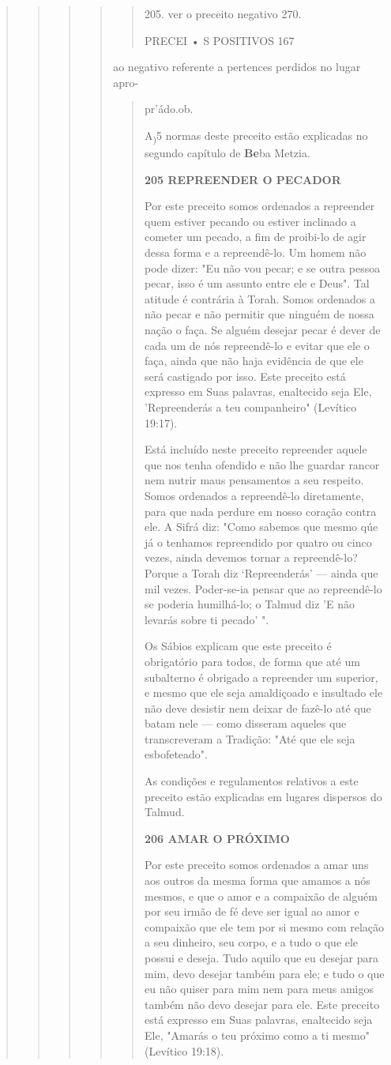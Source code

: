 \begin{quote}
\begin{quote}
\begin{quote}
\begin{quote}
\begin{quote}
205. ver o preceito negativo 270.

PRECEI • S POSITIVOS 167
\end{quote}

ao negativo referente a pertences perdidos no lugar apro-

\begin{quote}
pr'ádo.ob.

A\textsubscript{)}5 normas deste preceito estão explicadas no segundo
capítulo de \textbf{Be}ba Metzia.

\textbf{205 REPREENDER O PECADOR}

Por este preceito somos ordenados a repreender quem estiver pe­cando ou
estiver inclinado a cometer um pecado, a fim de proibi-lo de agir des­sa
forma e a repreendê-lo. Um homem não pode dizer: "Eu não vou pecar; e se
outra pessoa pecar, isso é um assunto entre ele e Deus". Tal atitude é
contrá­ria à Torah. Somos ordenados a não pecar e não permitir que
ninguém de nos­sa nação o faça. Se alguém desejar pecar é dever de cada
um de nós repreendê-lo e evitar que ele o faça, ainda que não haja
evidência de que ele será castigado por isso. Este preceito está
expresso em Suas palavras, enaltecido seja Ele, 'Re­preenderás a teu
companheiro" (Levítico 19:17).

Está incluído neste preceito repreender aquele que nos tenha ofen­dido e
não lhe guardar rancor nem nutrir maus pensamentos a seu respeito. Somos
ordenados a repreendê-lo diretamente, para que nada perdure em nos­so
coração contra ele. A Sifrá diz: "Como sabemos que mesmo qúe já o
tenha­mos repreendido por quatro ou cinco vezes, ainda devemos tornar a
repreendê-lo? Porque a Torah diz `Repreenderás' --- ainda que mil vezes.
Poder-se-ia pen­sar que ao repreendê-lo se poderia humilhá-lo; o Talmud
diz 'E não levarás so­bre ti pecado' ".

Os Sábios explicam que este preceito é obrigatório para todos, de forma
que até um subalterno é obrigado a repreender um superior, e mesmo que
ele seja amaldiçoado e insultado ele não deve desistir nem deixar de
fazê-lo até que batam nele --- como disseram aqueles que transcreveram a
Tradição: "Até que ele seja esbofeteado".

As condições e regulamentos relativos a este preceito estão explica­das
em lugares dispersos do Talmud.

\textbf{206 AMAR O PRÓXIMO}

Por este preceito somos ordenados a amar uns aos outros da mesma forma
que amamos a nós mesmos, e que o amor e a compaixão de alguém por seu
irmão de fé deve ser igual ao amor e compaixão que ele tem por si mesmo
com relação a seu dinheiro, seu corpo, e a tudo o que ele possui e
deseja. Tudo aquilo que eu desejar para mim, devo desejar também para
ele; e tudo o que eu não quiser para mim nem para meus amigos também não
devo desejar para ele. Este preceito está expresso em Suas palavras,
enaltecido seja Ele, "Amarás o teu próximo como a ti mesmo" (Levítico
19:18).


\end{quote}
\end{quote}
\end{quote}
\end{quote}
\end{quote}
